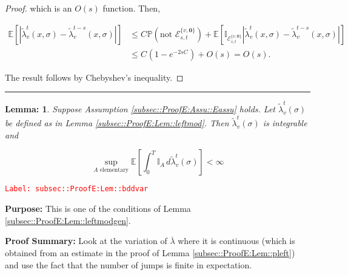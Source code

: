 \documentclass[12pt]{article}
\newcommand{\mb}{\mathbb}
\newcommand{\mc}{\mathcal}
\newcommand{\ov}{\overline}
\newcommand{\te}{\text}
\newcommand{\tr}{\textcolor{red}}
\newcommand{\labe}[1]{\tr{\texttt{Label: #1}}}
\newcommand{\purpose}{\textbf{Purpose: }}
\newcommand{\pfsum}{\textbf{Proof Summary: }}
\newcommand{\lin}{\rule{\linewidth}{0.4 pt}}
\newcommand{\pr}{\mb{P}}							%
\newcommand{\ex}[1]{\mb{E}\left[#1\right]}			%
\renewcommand{\root}{\mathbf{0}}				%
\renewcommand{\v}{v}							%
\renewcommand{\S}{S}							%
\newcommand{\s}{\sigma}							%
\newcommand{\T}{T}								%
\newcommand{\x}{x}								%
\renewcommand{\t}{t}							%
\renewcommand{\tt}{s}							%
\newcommand{\crate}[2]{\alt{\lambda}_{#1}^{#2}}		%
\newcommand{\const}[1]{C_{#1}}						%
\newcommand{\alt}{\widetilde}						%
\newcommand{\evnt}{\mc{E}}						%
\newcommand{\typset}{A}							%
\newtheorem{lem}[thms]{Lemma: }
\begin{document}
\begin{proof}
which is an \(O(s)\) function. Then,

\begin{align*}
\ex{|\crate{\v}{\t}(\x{}{},\s) - \crate{\v}{\t-\tt}(\x{}{},\s)|} &\leq \const{}\pr\left(\te{not }\evnt^{\{\v,\root\}}_{\tt,\t}\right) + \ex{\mb{I}_{\evnt^{\{\v,\root\}}_{\tt,\t}}|\crate{\v}{\t}(\x{}{},\s) - \crate{\v}{\t-\tt}(\x{}{},\s)|}\\
&\leq \const{}(1 - e^{-2\tt\const{}}) + O(s) = O(s).
\end{align*}

The result follows by Chebyshev's inequality.
\end{proof}

\lin

\begin{lem}
Suppose Assumption \ref{subsec::ProofE:Assu::Eassu} holds. Let \(\crate{\v}{\t}(\s)\) be defined as in Lemma \ref{subsec::ProofE:Lem::leftmod}. Then \(\crate{\v}{\t}(\s)\) is integrable and 

\[\sup_{\typset\te{ elementary}} \ex{\int_0^\T \mb{I}_\typset\,d\crate{\v}{\t}(\s)} < \infty\]
\label{subsec::ProofE:Lem::bddvar}
\end{lem}
\labe{subsec::ProofE:Lem::bddvar}

\purpose This is one of the conditions of Lemma \ref{subsec::ProofE:Lem::leftmodgen}.

\pfsum Look at the variation of \(\ov{\lambda}\) where it is continuous (which is obtained from an estimate in the proof of Lemma \ref{subsec::ProofE:Lem::pleft}) and use the fact that the number of jumps is finite in expectation.
\end{document}
